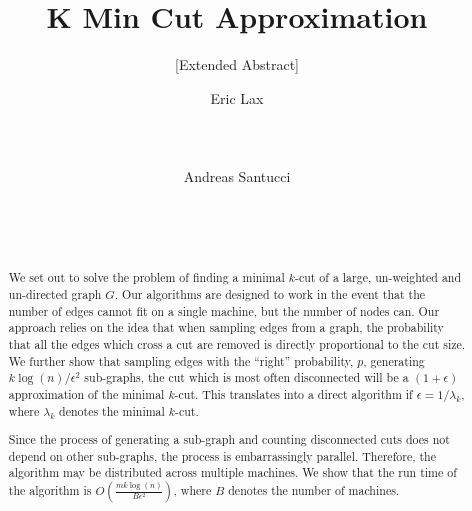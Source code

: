 \documentclass{acm_proc_article-sp}
\begin{document}
 

\title{\textbf{K Min Cut Approximation}}
\subtitle{[Extended Abstract]}
\author{
\alignauthor
Eric Lax \\
  \\
   \\
  \\
\alignauthor
Andreas Santucci \\
   \\
   \\
   \\
}
\maketitle

\begin{abstract}
We set out to solve the problem of finding a minimal $k$-cut of a large, un-weighted and un-directed graph $G$. Our algorithms are designed to work in the event that the number of edges cannot fit on a single machine, but the number of nodes can. Our approach relies on the idea that when sampling edges from a graph, the probability that all the edges which cross a cut are removed is directly proportional to the cut size. We further show that sampling edges with the ``right'' probability, $p$, generating $k \log(n)/\epsilon^2$ sub-graphs, the cut which is most often disconnected will be a $(1+\epsilon)$ approximation of the minimal $k$-cut. This translates into a direct algorithm if $\epsilon = 1/\lambda_k$, where $\lambda_k$ denotes the minimal $k$-cut.

Since the process of generating a sub-graph and counting disconnected cuts does not depend on other sub-graphs, the process is embarrassingly parallel. Therefore, the algorithm may be distributed across multiple machines. We show that the run time of the algorithm is $O(\frac{mk \log(n)}{B \epsilon^2})$, where $B$ denotes the number of machines.
\end{abstract}
\end{document}
